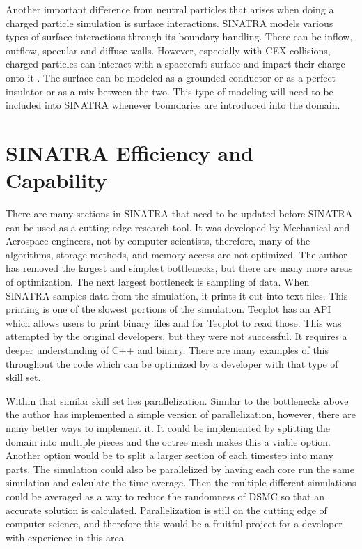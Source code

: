 \indent Another important difference from neutral particles that arises when doing a charged particle simulation is surface interactions. SINATRA models various types of surface interactions through its boundary handling. There can be inflow, outflow, specular and diffuse walls. However, especially with CEX collisions, charged particles can interact with a spacecraft surface and impart their charge onto it \cite{surface_charge}. The surface can be modeled as a grounded conductor or as a perfect insulator or as a mix between the two. This type of modeling will need to be included into SINATRA whenever boundaries are introduced into the domain.

\section{SINATRA Efficiency and Capability}
\label{sec:auto_mesh}
There are many sections in SINATRA that need to be updated before SINATRA can be used as a cutting edge research tool. It was developed by Mechanical and Aerospace engineers, not by computer scientists, therefore, many of the algorithms, storage methods, and memory access are not optimized. The author has removed the largest and simplest bottlenecks, but there are many more areas of optimization. The next largest bottleneck is sampling of data. When SINATRA samples data from the simulation, it prints it out into text files. This printing is one of the slowest portions of the simulation. Tecplot has an API which allows users to print binary files and for Tecplot to read those. This was attempted by the original developers, but they were not successful. It requires a deeper understanding of C++ and binary. There are many examples of this throughout the code which can be optimized by a developer with that type of skill set. \par

\indent Within that similar skill set lies parallelization. Similar to the bottlenecks above the author has implemented a simple version of parallelization, however, there are many better ways to implement it. It could be implemented by splitting the domain into multiple pieces and the octree mesh makes this a viable option. Another option would be to split a larger section of each timestep into many parts. The simulation could also be parallelized by having each core run the same simulation and calculate the time average. Then the multiple different simulations could be averaged as a way to reduce the randomness of DSMC so that an accurate solution is calculated. Parallelization is still on the cutting edge of computer science, and therefore this would be a fruitful project for a developer with experience in this area. \par

